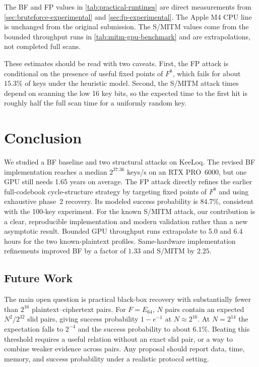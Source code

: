 \documentclass[version=preprint]{iacrcc}
\begin{document}
The BF and FP values in \autoref{tab:practical-runtimes} are direct measurements from \autoref{sec:bruteforce-experimental} and \autoref{sec:fp-experimental}.
The Apple M4 CPU line is unchanged from the original submission.
The S/MITM values come from the bounded throughput runs in \autoref{tab:mitm-gpu-benchmark} and are extrapolations, not completed full scans.

These estimates should be read with two caveats.
First, the FP attack is conditional on the presence of useful fixed points of $F^8$, which fails for about $15.3\%$ of keys under the heuristic model.
Second, the S/MITM attack times depend on scanning the low 16 key bits, so the expected time to the first hit is roughly half the full scan time for a uniformly random key.

\section{Conclusion}\label{sec:conclusion}

We studied a BF baseline and two structural attacks on KeeLoq.
The revised BF implementation reaches a median $2^{37.36}$ keys/s on an RTX PRO~6000, but one GPU still needs 1.65 years on average.
The FP attack directly refines the earlier full-codebook cycle-structure strategy by targeting fixed points of $F^8$ and using exhaustive phase~2 recovery.
Its modeled success probability is $84.7\%$, consistent with the 100-key experiment.
For the known S/MITM attack, our contribution is a clear, reproducible implementation and modern validation rather than a new asymptotic result.
Bounded GPU throughput runs extrapolate to 5.0 and 6.4 hours for the two known-plaintext profiles.
Same-hardware implementation refinements improved BF by a factor of $1.33$ and S/MITM by $2.25$.

\subsection{Future Work}

The main open question is practical black-box recovery with substantially fewer than $2^{16}$ plaintext--ciphertext pairs.
For $F=E_{64}$, $N$ pairs contain an expected $N^2/2^{32}$ slid pairs, giving success probability $1-e^{-1}$ at $N\approx2^{16}$.
At $N=2^{14}$ the expectation falls to $2^{-4}$ and the success probability to about $6.1\%$.
Beating this threshold requires a useful relation without an exact slid pair, or a way to combine weaker evidence across pairs.
Any proposal should report data, time, memory, and success probability under a realistic protocol setting.
\end{document}
